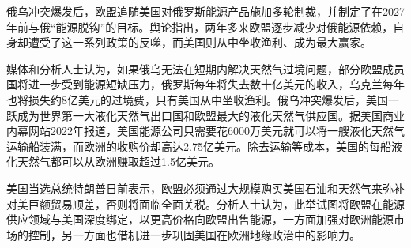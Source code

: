 俄乌冲突爆发后，欧盟追随美国对俄罗斯能源产品施加多轮制裁，并制定了在2027年前与俄“能源脱钩”的目标。舆论指出，两年多来欧盟逐步减少对俄能源依赖，自身却遭受了这一系列政策的反噬，而美国则从中坐收渔利、成为最大赢家。

媒体和分析人士认为，如果俄乌无法在短期内解决天然气过境问题，部分欧盟成员国将进一步受到能源短缺压力，俄罗斯每年将失去数十亿美元的收入，乌克兰每年也将损失约8亿美元的过境费，只有美国从中坐收渔利。俄乌冲突爆发后，美国一跃成为世界第一大液化天然气出口国和欧盟最大的液化天然气供应国。据美国商业内幕网站2022年报道，美国能源公司只需要花6000万美元就可以将一艘液化天然气运输船装满，而欧洲的收购价却高达2.75亿美元。除去运输等成本，美国的每船液化天然气都可以从欧洲赚取超过1.5亿美元。

美国当选总统特朗普日前表示，欧盟必须通过大规模购买美国石油和天然气来弥补对美巨额贸易顺差，否则将面临全面关税。分析人士认为，此举试图将欧盟在能源供应领域与美国深度绑定，以更高价格向欧盟出售能源，一方面加强对欧洲能源市场的控制，另一方面也借机进一步巩固美国在欧洲地缘政治中的影响力。